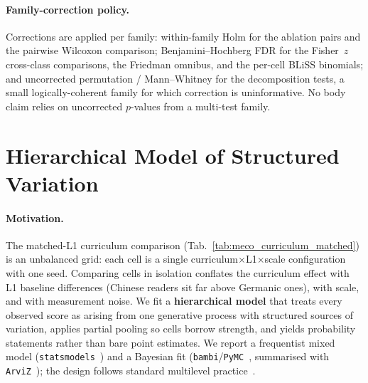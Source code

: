 \paragraph{Family-correction policy.} Corrections are applied per family: within-family Holm for the ablation pairs and the pairwise Wilcoxon comparison; Benjamini--Hochberg FDR for the Fisher~$z$ cross-class comparisons, the Friedman omnibus, and the per-cell BLiSS binomials; and uncorrected permutation / Mann--Whitney for the decomposition tests, a small logically-coherent family for which correction is uninformative. No body claim relies on uncorrected $p$-values from a multi-test family.
 
 
\section{Hierarchical Model of Structured Variation}\label{sec:hier-model}
 
\paragraph{Motivation.} The matched-L1 curriculum comparison (Tab.~\ref{tab:meco_curriculum_matched}) is an unbalanced grid: each cell is a single curriculum$\times$L1$\times$scale configuration with one seed. Comparing cells in isolation conflates the curriculum effect with L1 baseline differences (Chinese readers sit far above Germanic ones), with scale, and with measurement noise. We fit a \textbf{hierarchical model} that treats every observed score as arising from one generative process with structured sources of variation, applies partial pooling so cells borrow strength, and yields probability statements rather than bare point estimates. We report a frequentist mixed model (\texttt{statsmodels}~\citep{seabold2010statsmodels}) and a Bayesian fit (\texttt{bambi}/\texttt{PyMC}~\citep{capretto2022bambi,abrilpla2023pymc}, summarised with \texttt{ArviZ}~\citep{kumar2019arviz}); the design follows standard multilevel practice~\citep{gelman2007data}.
 
